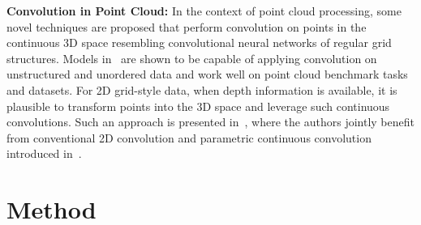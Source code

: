 \bigbreak\noindent\textbf{Convolution in Point Cloud:} In the context of point cloud processing, some novel techniques are proposed that perform convolution on points in the continuous 3D space resembling convolutional neural networks of regular grid structures. Models in~\cite{thomas2019kpconv, li2018pointcnn, xu2018spidercnn, wu2019pointconv, boulch2020convpoint, wang2018deep} are shown to be capable of applying convolution on unstructured and unordered data and work well on point cloud benchmark tasks and datasets. For 2D grid-style data, when depth information is available, it is plausible to transform points into the 3D space and leverage such continuous convolutions. Such an approach is presented in~\cite{chen2019learning}, where the authors jointly benefit from conventional 2D convolution and parametric continuous convolution introduced in~\cite{wang2018deep}.

\section{Method}

